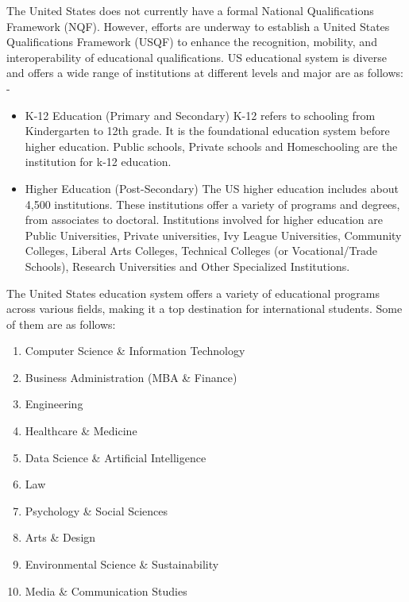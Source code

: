 The United States does not currently have a formal National Qualifications Framework (NQF). However, efforts are underway to establish a United States Qualifications Framework (USQF) to enhance the recognition, mobility, and interoperability of educational qualifications.
US educational system is diverse and offers a wide range of institutions at different levels and major are as follows: -
\begin{itemize}
    \item K-12 Education (Primary and Secondary)
    K-12 refers to schooling from Kindergarten to 12th grade. It is the foundational education system before higher education. Public schools, Private schools and Homeschooling are the institution for k-12 education.
    \item Higher Education (Post-Secondary)
    The US higher education includes about 4,500 institutions. These institutions offer a variety of programs and degrees, from associates to doctoral. Institutions involved for higher education are Public Universities, Private universities, Ivy League Universities, Community Colleges, Liberal Arts Colleges, Technical Colleges (or Vocational/Trade Schools), Research Universities and Other Specialized Institutions.
\end{itemize}


The United States education system offers a variety of educational programs across various fields, making it a top destination for international students. Some of them are as follows:

\begin{enumerate}
    \item Computer Science \& Information Technology
    \item Business Administration (MBA \& Finance)
    \item Engineering
    \item Healthcare \& Medicine
    \item Data Science \& Artificial Intelligence
    \item Law
    \item Psychology \& Social Sciences
    \item Arts \& Design
    \item Environmental Science \& Sustainability
    \item Media \& Communication Studies
\end{enumerate}

